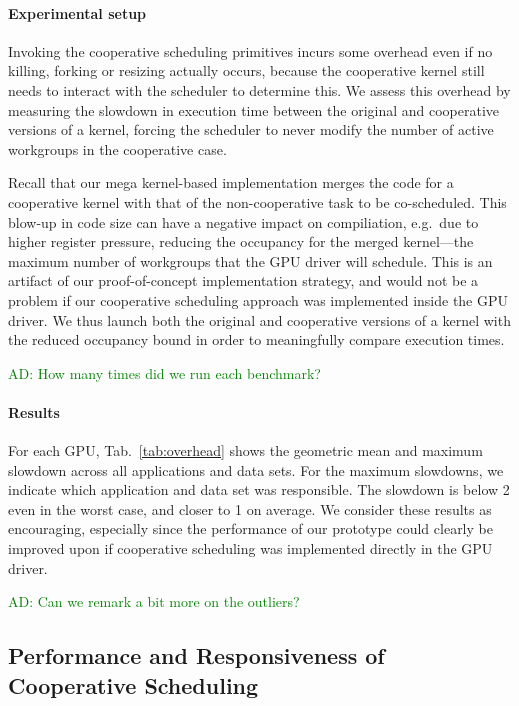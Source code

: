 \documentclass[numbers,nocopyrightspace,10pt]{sigplanconf}
\newcommand{\ADComment}[1]{\textcolor{green}{AD: #1}}
\newcommand{\mytab}{Tab.~}
\begin{document}
\paragraph{Experimental setup}
Invoking the cooperative scheduling primitives incurs some overhead
even if no killing, forking or resizing actually occurs, because the cooperative kernel still needs to interact with the scheduler to determine this.
We assess this overhead by measuring the
 slowdown in execution time between the original and cooperative versions of a kernel, forcing the scheduler to never modify the number of
active workgroups in the cooperative case.

Recall that our mega kernel-based implementation merges the code for a
cooperative kernel with that of the non-cooperative task to be
co-scheduled.  This blow-up in code size can have a negative impact on
compiliation, e.g.\ due to higher register pressure, reducing the
occupancy for the merged kernel---the maximum number of workgroups
that the GPU driver will schedule.  This is an artifact of our
proof-of-concept implementation strategy, and would not be a problem
if our cooperative scheduling approach was implemented inside the GPU
driver.  We thus launch both the original and cooperative versions of
a kernel with the reduced occupancy bound in order to meaningfully
compare execution times.

\ADComment{How many times did we run each benchmark?}

\paragraph{Results}
For each GPU, \mytab\ref{tab:overhead} shows the geometric mean and
maximum slowdown across all applications and data sets.  For the
maximum slowdowns, we indicate which application and data set was
responsible.  The slowdown is below 2 even in the worst case, and
closer to 1 on average. We consider these results as encouraging,
especially since the performance of our prototype could clearly be
improved upon if cooperative scheduling was implemented directly in
the GPU driver.

\ADComment{Can we remark a bit more on the outliers?}

\subsection{Performance and Responsiveness of Cooperative Scheduling}\label{sec:responsiveness}
\end{document}
